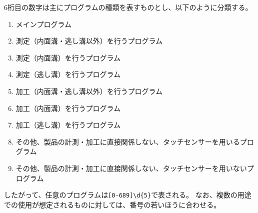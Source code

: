 6桁目の数字は主にプログラムの種類を表すものとし、以下のように分類する。
\begin{enumerate}[label=\arabic*., ref=\arabic*, start=0]
\item\label{item:6main} メインプログラム
\item\label{item:6Mmain} 測定（内面溝・逃し溝以外）を行うプログラム
\item\label{item:6MD} 測定（内面溝）を行うプログラム
\item\label{item:6MN} 測定（逃し溝）を行うプログラム
\item\label{item:6Kmain} 加工（内面溝・逃し溝以外）を行うプログラム
\item\label{item:6KD} 加工（内面溝）を行うプログラム
\item\label{item:6KN} 加工（逃し溝）を行うプログラム
\setcounter{enumi}{7}
\item\label{item:6oM} その他、製品の計測・加工に直接関係しない、タッチセンサーを用いるプログラム
\item\label{item:6o} その他、製品の計測・加工に直接関係しない、タッチセンサーを用いないプログラム
\end{enumerate}
したがって、任意のプログラムは\verb|[0-689]\d{5}|で表される。
なお、複数の用途での使用が想定されるものに対しては、番号の若いほうに合わせる。



